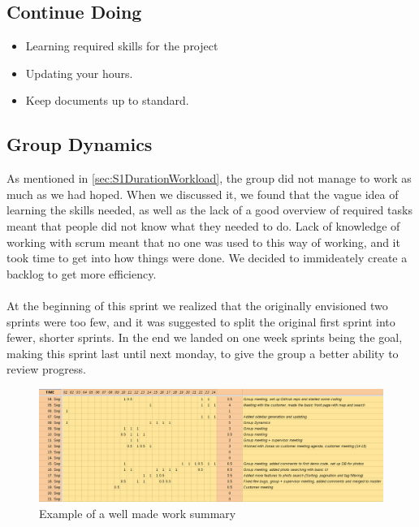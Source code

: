 \subsection{Continue Doing}
\label{subsec:S1RetrospectiveContinue}

\begin{itemize}
  \item Learning required skills for the project
  \item Updating your hours.
  \item Keep documents up to standard.
\end{itemize}

\subsection{Group Dynamics}
\label{subsec:S1RetrospectiveGroupDynamics}
As mentioned in \ref{sec:S1DurationWorkload}, the group did not manage to work as much as we had hoped. When we discussed it, we found that the vague idea of learning the skills needed, as well as the lack of a good overview of required tasks meant that people did not know what they needed to do. Lack of knowledge of working with scrum meant that no one was used to this way of working, and it took time to get into how things were done. We decided to immideately create a backlog to get more efficiency.

\paragraph{} At the beginning of this sprint we realized that the originally envisioned two sprints were too few, and it was suggested to split the original first sprint into fewer, shorter sprints. In the end we landed on one week sprints being the goal, making this sprint last until next monday, to give the group a better ability to review progress.

\begin{figure}[ht!]
  \includegraphics[width=\linewidth]{./img/WorkSheetExample}
  \caption{Example of a well made work summary}
\end{figure}


